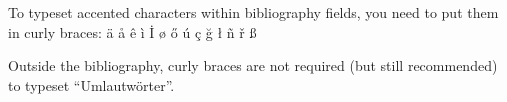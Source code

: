 To typeset accented characters within bibliography fields,
you need to put them in curly braces:
{\"a} {\aa} {\^e} {\`i} {\.I} {\o} {\H o} {\'u}
{\c c} {\u g} {\l} {\~n} {\v r} {\ss}

Outside the bibliography, curly braces are not required (but
still recommended) to typeset ``Umlautw\"orter''.
